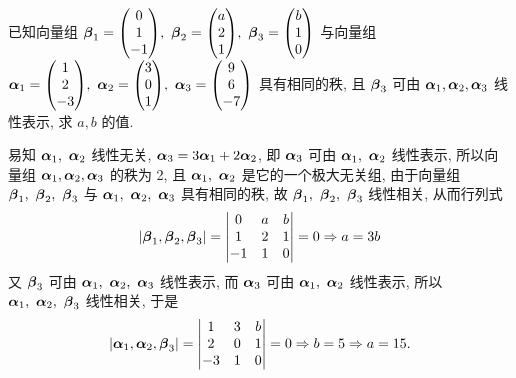 \begin{example}[2000 数二]
    已知向量组 $\vb*{\beta}_1=\mqty(0\\1\\-1),~\vb*{\beta}_2=\mqty(a\\2\\1),~\vb*{\beta}_3=\mqty(b\\1\\0)$ 与向量组 $\vb*{\alpha}_1=\mqty(1\\2\\-3),\\~\vb*{\alpha}_2=\mqty(3\\0\\1),~\vb*{\alpha}_3=\mqty(9\\6\\-7)$ 具有相同的秩, 且 $\vb*{\beta}_3$ 可由 $\vb*{\alpha}_1,\vb*{\alpha}_2,\vb*{\alpha}_3$ 线性表示, 求 $a,b$ 的值.
\end{example}
\begin{solution}
    易知 $\vb*{\alpha}_1,~\vb*{\alpha}_2$ 线性无关, $\vb*{\alpha}_3=3\vb*{\alpha}_1+2\vb*{\alpha}_2$, 即 $\vb*{\alpha}_3$ 可由 $\vb*{\alpha}_1,~\vb*{\alpha}_2$ 线性表示, 所以向量组 $\vb*{\alpha}_1,\vb*{\alpha}_2,\vb*{\alpha}_3$ 的秩为 2, 且 $\vb*{\alpha}_1,~\vb*{\alpha}_2$ 是它的一个极大无关组,
    由于向量组 $\vb*{\beta}_1,~\vb*{\beta}_2,~\vb*{\beta}_3$ 与 $\vb*{\alpha}_1,~\vb*{\alpha}_2,~\vb*{\alpha}_3$ 具有相同的秩, 故 $\vb*{\beta}_1,~\vb*{\beta}_2,~\vb*{\beta}_3$ 线性相关, 从而行列式
    $$|\vb*{\beta}_1,\vb*{\beta}_2,\vb*{\beta}_3|=\mqty|0&a&b\\1&2&1\\-1&1&0|=0\Rightarrow a=3b$$
    又 $\vb*{\beta}_3$ 可由 $\vb*{\alpha}_1,~\vb*{\alpha}_2,~\vb*{\alpha}_3$ 线性表示, 而 $\vb*{\alpha}_3$ 可由 $\vb*{\alpha}_1,~\vb*{\alpha}_2$ 线性表示, 所以 $\vb*{\alpha}_1,~\vb*{\alpha}_2,~\vb*{\beta}_3$ 线性相关, 于是
    $$|\vb*{\alpha}_1,\vb*{\alpha}_2,\vb*{\beta}_3|=\mqty|1&3&b\\2&0&1\\-3&1&0|=0\Rightarrow b=5\Rightarrow a=15.$$
\end{solution}

